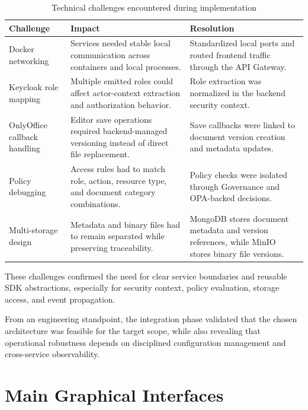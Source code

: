 \begin{table}[ht]
\centering
\caption{Technical challenges encountered during implementation}
\label{tab:implementation-technical-challenges}
\small
\setlength{\tabcolsep}{4pt}
\renewcommand{\arraystretch}{1.08}
\begin{tabularx}{\textwidth}{|L{3.2cm}|L{4.3cm}|Y|}
\hline
\textbf{Challenge} & \textbf{Impact} & \textbf{Resolution} \\
\hline
Docker networking & Services needed stable local communication across containers and local processes. & Standardized local ports and routed frontend traffic through the API Gateway. \\
\hline
Keycloak role mapping & Multiple emitted roles could affect actor-context extraction and authorization behavior. & Role extraction was normalized in the backend security context. \\
\hline
OnlyOffice callback handling & Editor save operations required backend-managed versioning instead of direct file replacement. & Save callbacks were linked to document version creation and metadata updates. \\
\hline
Policy debugging & Access rules had to match role, action, resource type, and document category combinations. & Policy checks were isolated through Governance and OPA-backed decisions. \\
\hline
Multi-storage design & Metadata and binary files had to remain separated while preserving traceability. & MongoDB stores document metadata and version references, while MinIO stores binary file versions. \\
\hline
\end{tabularx}
\normalsize
\end{table}

These challenges confirmed the need for clear service boundaries and reusable
SDK abstractions, especially for security context, policy evaluation, storage
access, and event propagation.

From an engineering standpoint, the integration phase validated that the chosen
architecture was feasible for the target scope, while also revealing that
operational robustness depends on disciplined configuration management and
cross-service observability.

\clearpage
\section{Main Graphical Interfaces}

